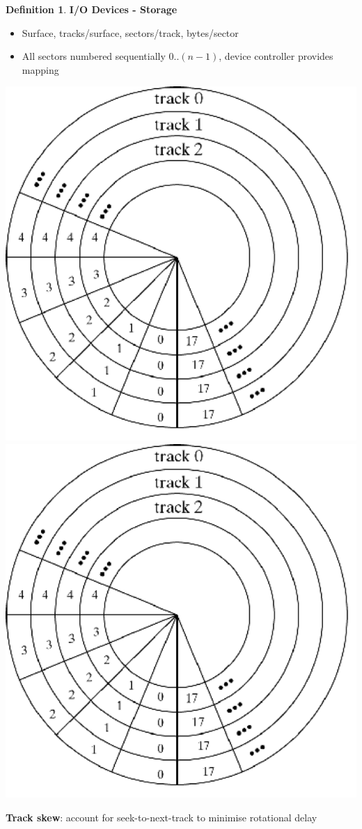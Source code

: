 \documentclass[11pt,a4paper]{article}
\theoremstyle{definition}
\newtheorem{definition}{Definition}[section]
\newenvironment{myitemize}
{ \begin{itemize}
    \setlength{\itemsep}{5pt}
    \setlength{\parskip}{0pt}
    \setlength{\parsep}{0pt}     }
{ \end{itemize}                  }
\begin{document}
\begin{definition}{\textbf{I/O Devices - Storage}}

	\begin{minipage}{0.3\linewidth}
		\begin{myitemize}
			\item Surface, tracks/surface, sectors/track, bytes/sector
			\item All sectors numbered sequentially $0..(n-1)$, device controller provides mapping
		\end{myitemize}
	\end{minipage}
	\begin{minipage}{0.7\linewidth}
		\includegraphics[width=0.5\linewidth]{m3/diskTrackView1}
		\includegraphics[width=0.5\linewidth]{m3/diskTrackView1}
	\end{minipage}
	
	\begin{minipage}{0.3\linewidth}
		\textbf{Track skew}: account for seek-to-next-track to minimise rotational delay
		

\end{minipage}
\end{definition}
\end{document}
